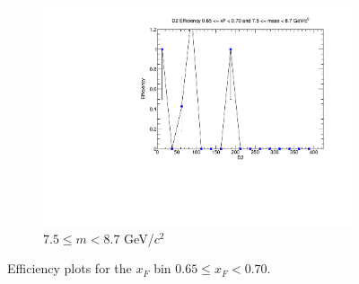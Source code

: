 \documentclass[11pt]{article}
\begin{document}
\begin{figure}[p]
\begin{subfigure}[b]{0.32\textwidth}
        \includegraphics[width=\textwidth]{./kTrackerEfficiencyPlots/D2_Efficiency_xF13_mass10.pdf}
        \caption{$7.5 \leq m < 8.7$ GeV/$c^2$}
    \end{subfigure}
    \caption{Efficiency plots for the $x_F$ bin $0.65 \leq x_F < 0.70$.}
\end{figure}
\end{document}

